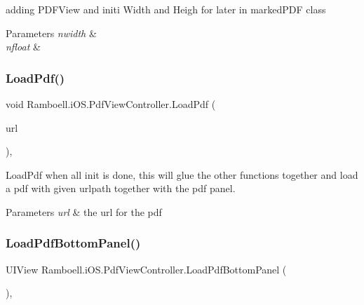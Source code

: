 adding P\+D\+F\+View and initi Width and Heigh for later in marked\+P\+DF class 


\begin{DoxyParams}{Parameters}
{\em nwidth} & \\
\hline
{\em nfloat} & \\
\hline
\end{DoxyParams}
\mbox{\label{class_ramboell_1_1i_o_s_1_1_pdf_view_controller_a99c92204a2fdec0fa8f085deda7c710a}} 
\subsubsection{\texorpdfstring{Load\+Pdf()}{LoadPdf()}}
{\footnotesize\ttfamily void Ramboell.\+i\+O\+S.\+Pdf\+View\+Controller.\+Load\+Pdf (\begin{DoxyParamCaption}\item[{N\+S\+Url}]{url }\end{DoxyParamCaption})\hspace{0.3cm}{\ttfamily [inline]}, {\ttfamily [private]}}



Load\+Pdf when all init is done, this will glue the other functions together and load a pdf with given urlpath together with the pdf panel. 


\begin{DoxyParams}{Parameters}
{\em url} & the url for the pdf\\
\hline
\end{DoxyParams}
\mbox{\label{class_ramboell_1_1i_o_s_1_1_pdf_view_controller_a636b53fa9debf8c5e062be6df567afa1}} 
\subsubsection{\texorpdfstring{Load\+Pdf\+Bottom\+Panel()}{LoadPdfBottomPanel()}}
{\footnotesize\ttfamily U\+I\+View Ramboell.\+i\+O\+S.\+Pdf\+View\+Controller.\+Load\+Pdf\+Bottom\+Panel (\begin{DoxyParamCaption}{ }\end{DoxyParamCaption})\hspace{0.3cm}{\ttfamily [inline]}, {\ttfamily [private]}}



